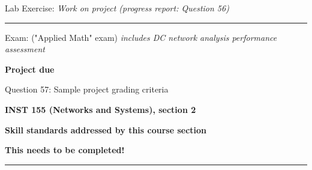 \hskip 10pt Lab Exercise: {\it Work on project (progress report: Question 56)}
 
\vskip 10pt

\hrule \vskip 5pt
\noindent
{}

\hskip 10pt Exam: ("Applied Math" exam) {\it includes DC network analysis performance assessment}
 
\hskip 10pt {\bf Project due} 

\hskip 10pt Question 57: Sample project grading criteria
 
\vskip 10pt





\vfil \eject

\centerline{\bf INST 155 (Networks and Systems), section 2} \bigskip 
 
\vskip 10pt

\noindent
{\bf Skill standards addressed by this course section}

\vskip 5pt

\noindent
{\bf This needs to be completed!}

\vskip 5pt

\hrule \vskip 10pt
\noindent
{}

\vskip 5pt

